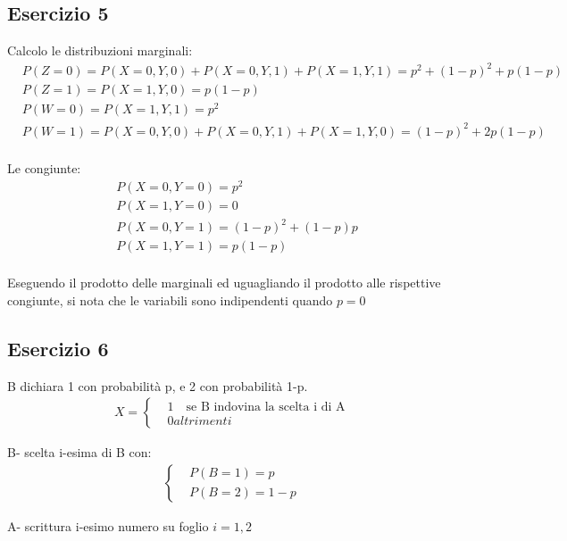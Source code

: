 \documentclass[12pt]{article}
\begin{document}
\subsection*{Esercizio 5}
Calcolo le distribuzioni marginali:
\begin{align*}
    &P(Z=0) = P(X=0,Y,0)+P(X=0,Y,1)+P(X=1,Y,1) = p^2+(1-p)^2+p(1-p) \\
    &P(Z = 1) = P(X=1,Y,0) = p(1-p) \\
    &P(W = 0) = P(X=1,Y,1) = p^2 \\
    &P(W = 1) = P(X=0,Y,0)+P(X=0,Y,1)+P(X=1,Y,0) = (1-p)^2+2p(1-p) \\
\end{align*}

Le congiunte:
\begin{align*}
    &P(X = 0, Y = 0) = p^2 \\
    &P(X = 1, Y = 0) = 0 \\
    &P(X = 0, Y = 1) = (1-p)^2+(1-p)p \\
    &P(X = 1, Y = 1) = p(1-p) \\
\end{align*}

Eseguendo il prodotto delle marginali ed uguagliando il prodotto alle rispettive congiunte, si nota che 
le variabili sono indipendenti quando \(p = 0\)
\newpage
\subsection*{Esercizio 6}
B dichiara 1 con probabilità p, e 2 con probabilità 1-p. 
\begin{align*}
    X =
    \begin{cases}
        &1 \quad \text{se B indovina la scelta i di A} \\
        &0 altrimenti    
    \end{cases}
\end{align*}

B- scelta i-esima di B con:
\begin{align*}
    \begin{cases}
        &P(B = 1) = p \\
        &P(B = 2) = 1-p
    \end{cases}
\end{align*}

A- scrittura i-esimo numero su foglio \(i = 1,2\)
\end{document}
